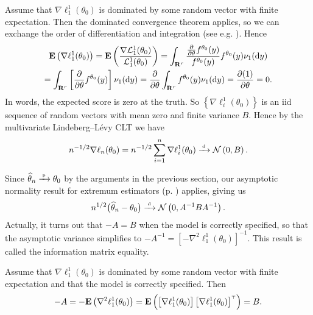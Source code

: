 \documentclass[11pt,letterpaper,reqno,oneside]{article}
\begin{document}
Assume that $\nabla \ell_1^1(\theta_0)$ is dominated by some random vector with finite expectation. Then the dominated convergence theorem applies, so we can exchange the order of differentiation and integration (see e.g. \textcite[][sec. 9.2]{Rosenthal2006}). Hence
%
\begin{multline*}
	\mathbf{E}\left( \nabla \ell_1^1(\theta_0) \right)
	= \mathbf{E}\left( \frac{ \nabla \mathcal{L}^1_1(\theta_0) }
	{ \mathcal{L}^1_1(\theta_0) } \right)
	= \int_{\mathbf{R}^r} \frac{ \frac{\partial}{\partial \theta} f^{\theta_0}(y) }
	{ f^{\theta_0}(y) } f^{\theta_0}(y) \nu_1(\mathrm{d} y)
	\\
	= \int_{\mathbf{R}^r} 
	\left[ \frac{\partial}{\partial \theta} f^{\theta_0}(y) \right] 
	\nu_1(\mathrm{d} y)
	= \frac{\partial}{\partial \theta} 
	\int_{\mathbf{R}^r} f^{\theta_0}(y) \nu_1(\mathrm{d} y)
	= \frac{\partial (1)}{\partial \theta} 
	= 0 .
\end{multline*}
%
In words, the expected score is zero at the truth. So $\left\{ \nabla \ell_i^1(\theta_0) \right\}$ is an iid sequence of random vectors with mean zero and finite variance $B$. Hence by the multivariate Lindeberg--Lévy CLT we have
%
\begin{equation*}
	n^{-1/2} \nabla \ell_n(\theta_0) 
	= n^{-1/2} \sum_{i=1}^n \nabla \ell^1_i(\theta_0) 
	\xrightarrow{{\scriptscriptstyle \mathrm{\;d\;}}} \mathcal{N}\left( 0, B \right) .
\end{equation*}


Since $\widehat{\theta}_n \xrightarrow{{\scriptscriptstyle \mathrm{\;p\;}}} \theta_0$ by the arguments in the previous section, our asymptotic normality result for extremum estimators (p. \pageref{proposition:asymptotic_normality}) applies, giving us
%
\begin{equation*}
	n^{1/2} \bigl( \widehat{\theta}_n - \theta_0 \bigr) 
	\xrightarrow{{\scriptscriptstyle \mathrm{\;d\;}}} \mathcal{N}\left( 0, A^{-1} B A^{-1} \right) .
\end{equation*}
%
Actually, it turns out that $-A=B$ when the model is correctly specified, so that the asymptotic variance simplifies to $-A^{-1} = \left[ - \nabla^2 \ell^1_1(\theta_0) \right]^{-1}$. This result is called the information matrix equality.
%
\begin{proposition}
	Assume that $\nabla \ell_1^1(\theta_0)$ is dominated by some random vector with finite expectation and that the model is correctly specified. Then
	\begin{equation*}
		- A 
		= - \mathbf{E}\left( \nabla^2 \ell^1_1(\theta_0) \right)
		= \mathbf{E}\left( \left[ \nabla \ell^1_1(\theta_0) \right]
		\left[ \nabla \ell^1_1(\theta_0) \right]^{\scriptscriptstyle \top} \right)
		= B .
	\end{equation*}
\end{proposition}
\end{document}
